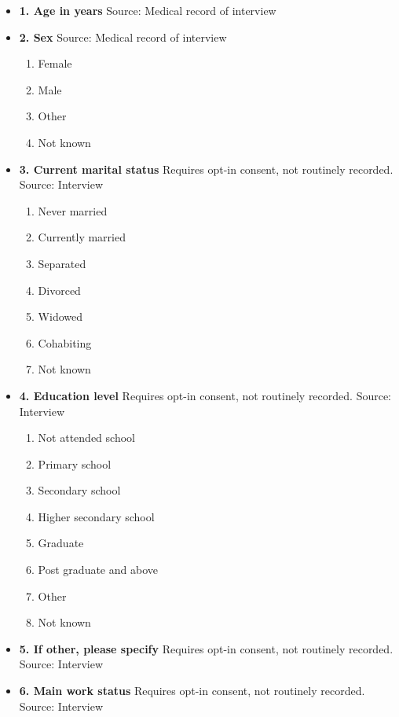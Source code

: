 \documentclass[
]{scrartcl}
\providecommand{\tightlist}{%
  \setlength{\itemsep}{0pt}\setlength{\parskip}{0pt}}\usepackage{longtable,booktabs,array}
\begin{document}
\begin{itemize}
\item
  \textbf{1. Age in years} Source: Medical record of interview
\item
  \textbf{2. Sex} Source: Medical record of interview

  \begin{enumerate}
  \def\labelenumi{\arabic{enumi}.}
  \tightlist
  \item
    Female
  \item
    Male
  \item
    Other
  \item
    Not known
  \end{enumerate}
\item
  \textbf{3. Current marital status} Requires opt-in consent, not
  routinely recorded. Source: Interview

  \begin{enumerate}
  \def\labelenumi{\arabic{enumi}.}
  \tightlist
  \item
    Never married
  \item
    Currently married
  \item
    Separated
  \item
    Divorced
  \item
    Widowed
  \item
    Cohabiting
  \item
    Not known
  \end{enumerate}
\item
  \textbf{4. Education level} Requires opt-in consent, not routinely
  recorded. Source: Interview

  \begin{enumerate}
  \def\labelenumi{\arabic{enumi}.}
  \tightlist
  \item
    Not attended school
  \item
    Primary school
  \item
    Secondary school
  \item
    Higher secondary school
  \item
    Graduate
  \item
    Post graduate and above
  \item
    Other
  \item
    Not known
  \end{enumerate}
\item
  \textbf{5. If other, please specify} Requires opt-in consent, not
  routinely recorded. Source: Interview
\item
  \textbf{6. Main work status} Requires opt-in consent, not routinely
  recorded. Source: Interview


\end{itemize}
\end{document}
